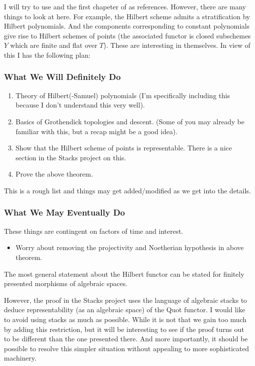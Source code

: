 \documentclass[ignorenonframetext]{beamer}
\theoremstyle{definition}
\begin{document}
I will try to use \cite{FGAExplained} and the first chapeter of \cite{Kollar} as references. 
However, there are many things to look at here. For example, the Hilbert scheme admits a stratification by Hilbert polynomials. And the components corresponding to constant polynomials give rise to Hilbert schemes of points (the associated functor is closed subschemes $Y$ which are finite and flat over $T$). These are interesting in themselves. In view of this I has the following plan:
\vspace{.3cm}
\begin{frame}
\frametitle{What We Will Definitely Do}
\begin{enumerate}
	\item Theory of Hilbert(-Samuel) polynomials (I'm specifically including this because I don't understand this very well).
	\item Basics of Grothendick topologies and descent. (Some of you may already be familiar with this, but a recap might be a good idea).
	\item Show that the Hilbert scheme of points is representable. There is a nice section in the Stacks project on this.
	\item Prove the above theorem.
\end{enumerate}

This is a rough list and things may get added/modified as we get into the details.
\end{frame}

\vspace{.3cm}

\begin{frame}
\frametitle{What We May Eventually Do}

These things are contingent on factors of time and interest.
\begin{itemize}
	\item Worry about removing the projectivity and Noetherian hypothesis in above theorem.
\end{itemize}

The most general statement about the Hilbert functor can be stated for finitely presented morphisms of algebraic spaces.
\end{frame}

However, the proof in the Stacks project uses the language of algebraic stacks to deduce representability (as an algebraic space) of the Quot functor. I would like to avoid using stacks as much as possible. While it is not that we gain too much by adding this restriction, but it will be interesting to see if the proof turns out to be different than the one presented there. And more importantly, it should be possible to resolve this simpler situation without appealing to more sophisticated machinery. 



\end{document}
